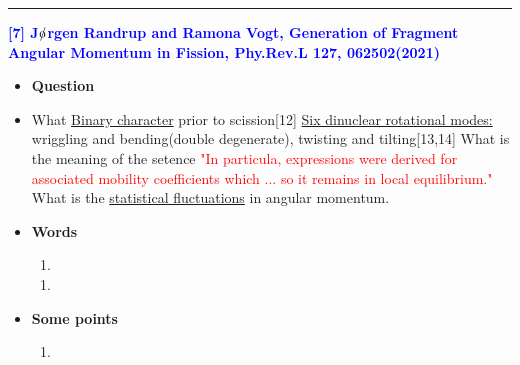 \vspace{8pt}
\noindent\rule[0.25\baselineskip]{\textwidth}{2pt}
\noindent \textcolor{blue}{\textbf{[7] J${\rm o\mkern-8.5mu/}$rgen Randrup and Ramona Vogt, Generation of Fragment Angular Momentum in Fission, Phy.Rev.L 127, 062502(2021)}}
\begin{itemize}[leftmargin=10pt]
    \item \textbf{Question}
    \item What \newline
        \underline{Binary character} prior to scission[12] \newline
        \underline{Six dinuclear rotational modes:} wriggling and bending(double degenerate), twisting and tilting[13,14]\newline
        What is the meaning of the setence \textcolor{red}{"In particula, expressions were derived for associated mobility coefficients which ... so it remains in local equilibrium."}\newline
        What is the \underline{statistical fluctuations} in angular momentum.
    \item \textbf{Words}
    \begin{enumerate}[leftmargin=10pt]
        \item 
    \end{enumerate}
    \begin{enumerate}[leftmargin=10pt]
        \item 
    \end{enumerate}
    \item \textbf{Some points}
    \begin{enumerate}[leftmargin=10pt]
        \item 
    \end{enumerate}
\end{itemize}

